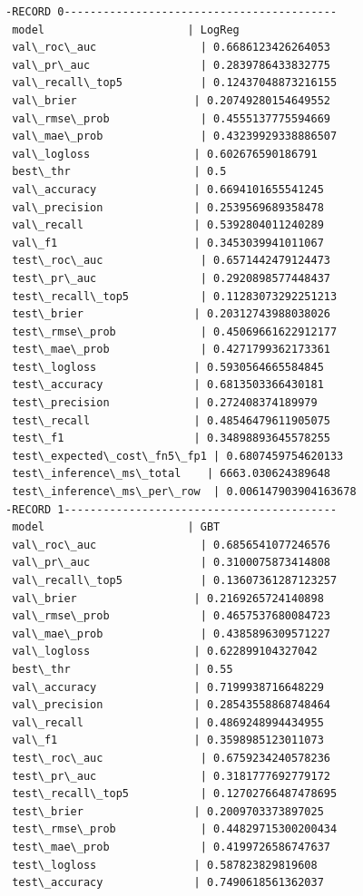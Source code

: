 \documentclass[11pt]{article}
\begin{document}
    \begin{Verbatim}[commandchars=\\\{\}]
-RECORD 0------------------------------------------
 model                      | LogReg
 val\_roc\_auc                | 0.6686123426264053
 val\_pr\_auc                 | 0.2839786433832775
 val\_recall\_top5            | 0.12437048873216155
 val\_brier                  | 0.20749280154649552
 val\_rmse\_prob              | 0.4555137775594669
 val\_mae\_prob               | 0.43239929338886507
 val\_logloss                | 0.602676590186791
 best\_thr                   | 0.5
 val\_accuracy               | 0.6694101655541245
 val\_precision              | 0.2539569689358478
 val\_recall                 | 0.5392804011240289
 val\_f1                     | 0.3453039941011067
 test\_roc\_auc               | 0.6571442479124473
 test\_pr\_auc                | 0.2920898577448437
 test\_recall\_top5           | 0.11283073292251213
 test\_brier                 | 0.20312743988038026
 test\_rmse\_prob             | 0.45069661622912177
 test\_mae\_prob              | 0.4271799362173361
 test\_logloss               | 0.5930564665584845
 test\_accuracy              | 0.6813503366430181
 test\_precision             | 0.272408374189979
 test\_recall                | 0.48546479611905075
 test\_f1                    | 0.34898893645578255
 test\_expected\_cost\_fn5\_fp1 | 0.6807459754620133
 test\_inference\_ms\_total    | 6663.030624389648
 test\_inference\_ms\_per\_row  | 0.006147903904163678
-RECORD 1------------------------------------------
 model                      | GBT
 val\_roc\_auc                | 0.6856541077246576
 val\_pr\_auc                 | 0.3100075873414808
 val\_recall\_top5            | 0.13607361287123257
 val\_brier                  | 0.2169265724140898
 val\_rmse\_prob              | 0.4657537680084723
 val\_mae\_prob               | 0.4385896309571227
 val\_logloss                | 0.622899104327042
 best\_thr                   | 0.55
 val\_accuracy               | 0.7199938716648229
 val\_precision              | 0.28543558868748464
 val\_recall                 | 0.4869248994434955
 val\_f1                     | 0.3598985123011073
 test\_roc\_auc               | 0.6759234240578236
 test\_pr\_auc                | 0.3181777692779172
 test\_recall\_top5           | 0.12702766487478695
 test\_brier                 | 0.2009703373897025
 test\_rmse\_prob             | 0.44829715300200434
 test\_mae\_prob              | 0.4199726586747637
 test\_logloss               | 0.587823829819608
 test\_accuracy              | 0.7490618561362037

\end{Verbatim}
\end{document}
